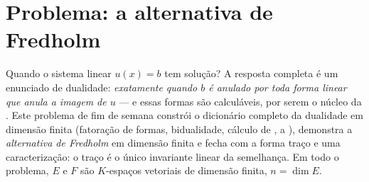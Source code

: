 \section{Problema: a alternativa de Fredholm}

Quando o sistema linear $u(x) = b$ tem solução? A
resposta completa é um enunciado de dualidade: \emph{exatamente quando $b$ é
anulado por toda forma linear que anula a imagem de
$u$} --- e essas formas são calculáveis, por serem o núcleo da
. Este problema de fim de semana constrói o dicionário completo da
dualidade em dimensão finita (fatoração de formas, bidualidade,
cálculo de , a ), demonstra a
\emph{alternativa de Fredholm} em dimensão finita e fecha com
a forma traço e uma caracterização: o traço é o único
invariante linear da semelhança. Em todo o problema, $E$ e $F$ são
$K$-espaços vetoriais de dimensão finita, $n = \dim E$.

